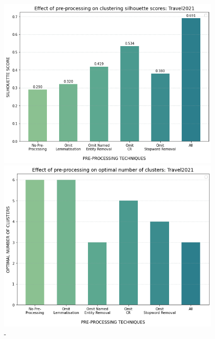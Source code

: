 \begin{figure}[H]
\centering
  \begin{minipage}[t]{.49\linewidth}
    \centering
    \includegraphics[width=\linewidth]{images/eval/effect_preprocessing.png}
    \caption{-}
    \label{fig:pre-processing_sil}
  \end{minipage}
  \begin{minipage}[t]{.49\textwidth}
    \centering
    \includegraphics[width=\linewidth]{images/eval/preprocessing_cluster_no.png}
    \caption{-}
     \label{fig:pre-processing_cluster_no}
  \end{minipage}
\end{figure}

